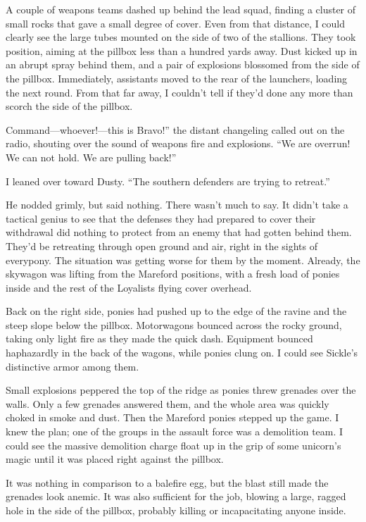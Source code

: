 A couple of weapons teams dashed up behind the lead squad, finding a cluster of small rocks that gave a small degree of cover. Even from that distance, I could clearly see the large tubes mounted on the side of two of the stallions. They took position, aiming at the pillbox less than a hundred yards away. Dust kicked up in an abrupt spray behind them, and a pair of explosions blossomed from the side of the pillbox. Immediately, assistants moved to the rear of the launchers, loading the next round. From that far away, I couldn’t tell if they’d done any more than scorch the side of the pillbox.

\leavevmode{}Command—whoever!—this is Bravo!” the distant changeling called out on the radio, shouting over the sound of weapons fire and explosions. “We are overrun! We can not hold. We are pulling back!”

I leaned over toward Dusty. “The southern defenders are trying to retreat.”

He nodded grimly, but said nothing. There wasn’t much to say. It didn’t take a tactical genius to see that the defenses they had prepared to cover their withdrawal did nothing to protect from an enemy that had gotten behind them. They’d be retreating through open ground and air, right in the sights of everypony. The situation was getting worse for them by the moment. Already, the skywagon was lifting from the Mareford positions, with a fresh load of ponies inside and the rest of the Loyalists flying cover overhead.

Back on the right side, ponies had pushed up to the edge of the ravine and the steep slope below the pillbox. Motorwagons bounced across the rocky ground, taking only light fire as they made the quick dash. Equipment bounced haphazardly in the back of the wagons, while ponies clung on. I could see Sickle’s distinctive armor among them.

Small explosions peppered the top of the ridge as ponies threw grenades over the walls. Only a few grenades answered them, and the whole area was quickly choked in smoke and dust. Then the Mareford ponies stepped up the game. I knew the plan; one of the groups in the assault force was a demolition team. I could see the massive demolition charge float up in the grip of some unicorn’s magic until it was placed right against the pillbox.

It was nothing in comparison to a balefire egg, but the blast still made the grenades look anemic. It was also sufficient for the job, blowing a large, ragged hole in the side of the pillbox, probably killing or incapacitating anyone inside.

